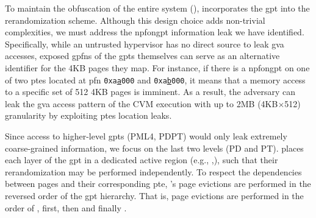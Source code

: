 To maintain the obfuscation of the entire system (\reqfullsystem), \thename incorporates the \gls{gpt} into the rerandomization scheme.
Although this design choice adds non-trivial complexities, we must address the \gls{npfongpt} information leak we have identified.
Specifically, while an untrusted hypervisor has no direct source to leak \gls{gva} accesses, exposed \glspl{gpfn} of the \glspl{gpt} themselves can serve as an alternative identifier for the 4KB pages they map.
For instance, if there is a \gls{npfongpt} on one of two \glspl{pte} located at \gls{pfn} {\tt 0xa{\underline{a}}000} and {\tt 0xa{\underline{b}}000}, it means that a memory access to a specific set of 512 4KB pages is imminent.
As a result, the adversary can leak the \gls{gva} access pattern of the CVM execution with up to 2MB (4KB$\times$512) granularity by exploiting \glspl{pte} location leaks.


Since access to higher-level \glspl{gpt} (PML4, PDPT) would only leak extremely coarse-grained information, we focus on the last two levels (PD and PT).
\thename places each layer of the \gls{gpt} in a dedicated active region (e.g., ,), such that their rerandomization may be performed independently.
To respect the dependencies between pages and their corresponding \gls{pte}, \thename's page evictions are performed in the reversed order of the \gls{gpt} hierarchy.
That is, page evictions are performed in the order of ,  first, then  and finally .



